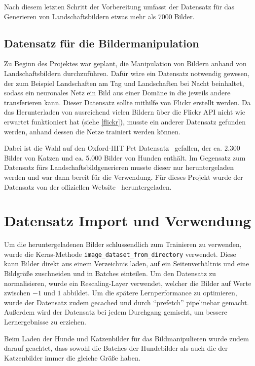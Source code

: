 Nach diesem letzten Schritt der Vorbereitung umfasst der Datensatz für das
Generieren von Landschaftsbildern etwas mehr als 7000 Bilder.

\subsection{Datensatz für die Bildermanipulation}

Zu Beginn des Projektes war geplant, die Manipulation von Bildern anhand von
Landschaftsbildern durchzuführen. Dafür wäre ein Datensatz notwendig gewesen,
der zum Beispiel Landschaften am Tag und Landschaften bei Nacht beinhaltet,
sodass ein neuronales Netz ein Bild aus einer Domäne in die jeweils andere
transferieren kann. Dieser Datensatz sollte mithilfe von Flickr erstellt werden.
Da das Herunterladen von ausreichend vielen Bildern über die Flickr API nicht wie
erwartet funktioniert hat (siehe \cref{flickr}), musste ein anderer Datensatz gefunden werden, anhand
dessen die Netze trainiert werden können.

Dabei ist die Wahl auf den Oxford-IIIT Pet Datensatz~\cite{parkhi12a} gefallen,
der ca. 2.300 Bilder von Katzen und ca. 5.000 Bilder von Hunden enthält. Im
Gegensatz zum Datensatz fürs Landschaftsbildgenerieren musste dieser nur
heruntergeladen werden und war dann bereit für die Verwendung. Für dieses
Projekt wurde der Datensatz von der offiziellen Website~\cite{Pets:Download}
heruntergeladen.

\section{Datensatz Import und Verwendung}%
Um die heruntergeladenen Bilder schlussendlich zum Trainieren zu verwenden,
wurde die Keras-Methode  \texttt{image\_dataset\_from\_directory} verwendet.
Diese kann Bilder direkt aus einem Verzeichnis laden, auf ein Seitenverhältnis
und eine Bildgröße zuschneiden und in Batches einteilen. Um den Datensatz zu
normalisieren, wurde ein Rescaling-Layer verwendet, welcher die Bilder auf Werte
zwischen $-1$ und $1$ abbildet. Um die spätere Lernperformance zu optimieren, wurde
der Datensatz zudem gecached und durch \enquote{prefetch} pipelinebar gemacht.
Außerdem wird der Datensatz bei jedem Durchgang gemischt, um bessere
Lernergebnisse zu erziehen. 

Beim Laden der Hunde und Katzenbilder für das Bildmanipulieren wurde zudem
darauf geachtet, dass sowohl die Batches der Hundebilder als auch die der
Katzenbilder immer die gleiche Größe haben. 
